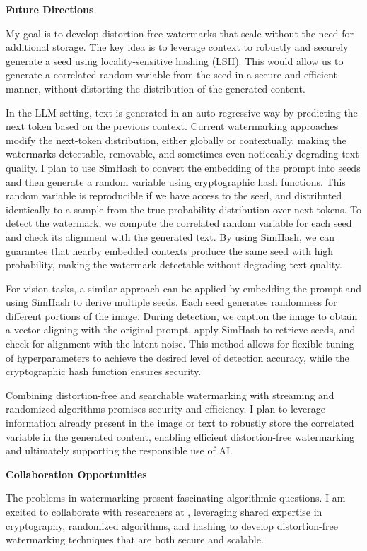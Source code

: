 \documentclass[11pt]{article}
\begin{document}
{{ \large \textbf{Future Directions}}

My goal is to develop distortion-free watermarks that scale without the need for additional storage.
The key idea is to leverage context to robustly and securely generate a seed using locality-sensitive hashing (LSH).
This would allow us to generate a correlated random variable from the seed in a secure and efficient manner, without distorting the distribution of the generated content.

In the LLM setting, text is generated in an auto-regressive way by predicting the next token based on the previous context. Current watermarking approaches modify the next-token distribution, either globally or contextually, making the watermarks detectable, removable, and sometimes even noticeably degrading text quality. I plan to use SimHash to convert the embedding of the prompt into seeds and then generate a random variable using cryptographic hash functions. This random variable is reproducible if we have access to the seed, and distributed identically to a sample from the true probability distribution over next tokens. To detect the watermark, we compute the correlated random variable for each seed and check its alignment with the generated text. By using SimHash, we can guarantee that nearby embedded contexts produce the same seed with high probability, making the watermark detectable without degrading text quality.

For vision tasks, a similar approach can be applied by embedding the prompt and using SimHash to derive multiple seeds. Each seed generates randomness for different portions of the image. During detection, we caption the image to obtain a vector aligning with the original prompt, apply SimHash to retrieve seeds, and check for alignment with the latent noise. This method allows for flexible tuning of hyperparameters to achieve the desired level of detection accuracy, while the cryptographic hash function ensures security.

Combining distortion-free and searchable watermarking with streaming and randomized algorithms promises security and efficiency. I plan to leverage information already present in the image or text to robustly store the correlated variable in the generated content, enabling efficient distortion-free watermarking and ultimately supporting the responsible use of AI.

{ \large \textbf{Collaboration Opportunities}}

The problems in watermarking present fascinating algorithmic questions. I am excited to collaborate with researchers at \school, leveraging shared expertise in cryptography, randomized algorithms, and hashing to develop distortion-free watermarking techniques that are both secure and scalable.

}
\end{document}
